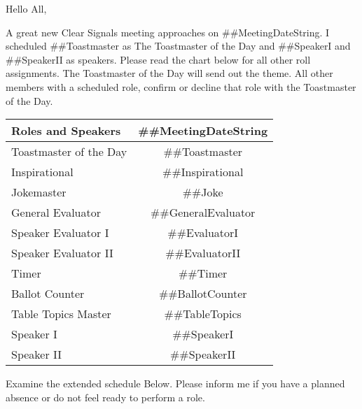 \documentclass{article}
\newcommand{\meetingDateString}{##MeetingDateString}
\newcommand{\toastmaster}{##Toastmaster}
\newcommand{\tableTopics}{##TableTopics}
\newcommand{\generalEvaluator}{##GeneralEvaluator}
\newcommand{\evaluatorI}{##EvaluatorI}
\newcommand{\evaluatorII}{##EvaluatorII}
\newcommand{\speakerI}{##SpeakerI}
\newcommand{\speakerII}{##SpeakerII}
\newcommand{\timer}{##Timer}
\newcommand{\inspirational}{##Inspirational}
\newcommand{\ballotCounter}{##BallotCounter}
\newcommand{\joke}{##Joke}
\begin{document}
 Hello All,
 
   A great new Clear Signals meeting approaches on \meetingDateString{}.  I scheduled \toastmaster{} as The Toastmaster of the Day and \speakerI{} and \speakerII{} as speakers.  Please read the chart below for all other roll assignments.  The Toastmaster of the Day will send out the theme.  All other members with a scheduled role, confirm or decline that role with the Toastmaster of the Day.   

  \begin{tabular}{ |l|c| }
    \hline
    Roles and Speakers & \meetingDateString{} \\
    \hline
    Toastmaster of the Day & \toastmaster{} \\
    \hline
    Inspirational & \inspirational{} \\
    \hline
    Jokemaster & \joke{} \\
    \hline
    General Evaluator & \generalEvaluator{} \\
    \hline
    Speaker Evaluator I & \evaluatorI{} \\
    \hline
    Speaker Evaluator II & \evaluatorII{} \\
    \hline
    Timer & \timer{} \\
    \hline
    Ballot Counter & \ballotCounter{} \\
    \hline
    Table Topics Master & \tableTopics{} \\
    \hline\hline
    Speaker I & \speakerI{} \\
    \hline
    Speaker II & \speakerII{} \\
    \hline
  \end{tabular}
  
  Examine the extended schedule Below.  Please inform me if you have a planned absence or do not feel ready to perform a role. 
  
\end{document}
